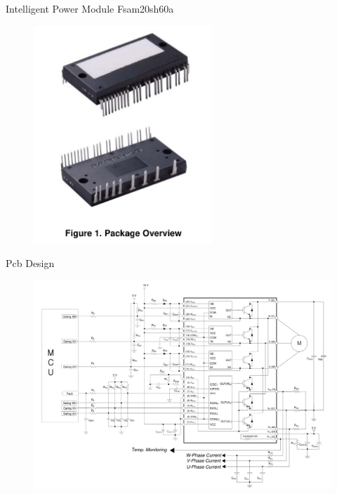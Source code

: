 \begin{frame}{Intelligent Power Module Fsam20sh60a}
	\begin{figure}
		\centering
		\includegraphics[width=0.6\textwidth]{sections/section4/images/IPM/ipm.png}
	\end{figure}
\end{frame}

\begin{frame}{Pcb Design}
	\begin{figure}
		\centering
		\includegraphics[width=\textwidth]{sections/section4/images/PCBDesign/ApplicationCircuitfromDatasheet.png}
	\end{figure}
\end{frame}

